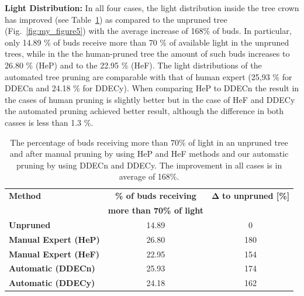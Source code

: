 \noindent\textbf{Light Distribution:} In all four cases, the light distribution inside the tree crown has
improved (see Table~\ref{tab:light}) as compared to the unpruned tree (Fig.~\ref{fig:my_figure5}) with the average increase of 168\% of buds. 
In particular, only 14.89 \% of buds receive more than 70 \% of available light in the unpruned trees, 
while in the the human-pruned tree the amount of such buds increases to 26.80 \% (HeP) and to the 22.95 \% (HeF).
The light distributions of the automated tree pruning are comparable with
that of human expert (25,93 \% for DDECn and 24.18 \% for DDECy). 
When comparing HeP to DDECn the result in the cases of human pruning is slightly better but in the case of HeF and DDECy the automated pruning achieved better result, although the difference in both casses is less than 1.3 \%.  
\begin{table}[hbt]
\label{tab:light}
\begin{center}
\begin{tabular}{ |l|c|c| } 
 \hline
 \textbf{Method} & \textbf{\% of buds receiving}                           & $\mathbf{\Delta}$ \textbf{to unpruned [\%]} \\ 
                 &  \textbf{more than 70\% of light}                       &  \\ 
 \hline
 \textbf{Unpruned}            & 14.89 & 0 \\ 
 \hline
 \textbf{Manual Expert (HeP)} & 26.80 & 180 \\ 
 \textbf{Manual Expert (HeF)} & 22.95 & 154 \\ 
  \hline
 \textbf{Automatic (DDECn)} & 25.93 & 174 \\ 
 \textbf{Automatic (DDECy)} & 24.18 & 162 \\ 
 \hline
\end{tabular}
\end{center}
\caption{The percentage of buds receiving more than 70\% of light in an unpruned tree and after manual pruning by using HeP and HeF methods and our automatic pruning by using DDECn and DDECy. The improvement in all cases is in average of 168\%. }
\end{table}

